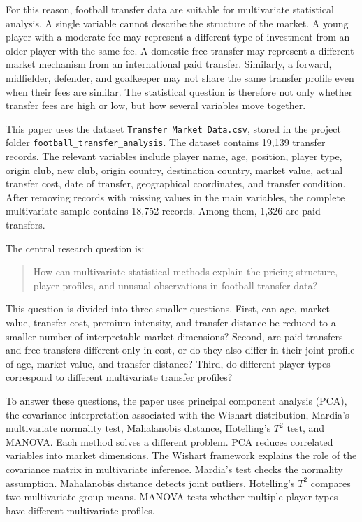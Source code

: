 \documentclass[12pt]{article}
\begin{document}
For this reason, football transfer data are suitable for multivariate statistical analysis. A single variable cannot describe the structure of the market. A young player with a moderate fee may represent a different type of investment from an older player with the same fee. A domestic free transfer may represent a different market mechanism from an international paid transfer. Similarly, a forward, midfielder, defender, and goalkeeper may not share the same transfer profile even when their fees are similar. The statistical question is therefore not only whether transfer fees are high or low, but how several variables move together.

This paper uses the dataset \texttt{Transfer Market Data.csv}, stored in the project folder \texttt{football\_transfer\_analysis}. The dataset contains 19,139 transfer records. The relevant variables include player name, age, position, player type, origin club, new club, origin country, destination country, market value, actual transfer cost, date of transfer, geographical coordinates, and transfer condition. After removing records with missing values in the main variables, the complete multivariate sample contains 18,752 records. Among them, 1,326 are paid transfers.

The central research question is:

\begin{quote}
How can multivariate statistical methods explain the pricing structure, player profiles, and unusual observations in football transfer data?
\end{quote}

This question is divided into three smaller questions. First, can age, market value, transfer cost, premium intensity, and transfer distance be reduced to a smaller number of interpretable market dimensions? Second, are paid transfers and free transfers different only in cost, or do they also differ in their joint profile of age, market value, and transfer distance? Third, do different player types correspond to different multivariate transfer profiles?

To answer these questions, the paper uses principal component analysis (PCA), the covariance interpretation associated with the Wishart distribution, Mardia's multivariate normality test, Mahalanobis distance, Hotelling's $T^2$ test, and MANOVA. Each method solves a different problem. PCA reduces correlated variables into market dimensions. The Wishart framework explains the role of the covariance matrix in multivariate inference. Mardia's test checks the normality assumption. Mahalanobis distance detects joint outliers. Hotelling's $T^2$ compares two multivariate group means. MANOVA tests whether multiple player types have different multivariate profiles.
\end{document}
